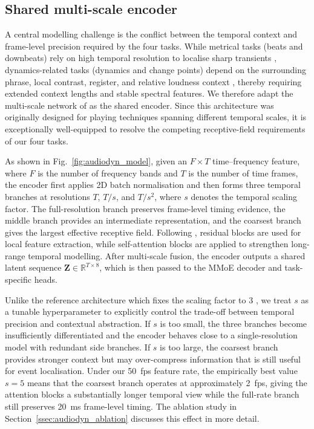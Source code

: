 \subsection{Shared multi-scale encoder}
\label{ssec:audiodyn_encoder}
A central modelling challenge is the conflict between the temporal context and frame-level precision required by the four tasks. While metrical tasks (beats and downbeats) rely on high temporal resolution to localise sharp transients \cite{bock2020deconstruct}, dynamics-related tasks (dynamics and change points) depend on the surrounding phrase, local contrast, register, and relative loudness context \cite{narang2024automatic}, thereby requiring extended context lengths and stable spectral features. We therefore adapt the multi-scale network of \cite{li2023frame} as the shared encoder. Since this architecture was originally designed for playing techniques spanning different temporal scales, it is exceptionally well-equipped to resolve the competing receptive-field requirements of our four tasks.

As shown in Fig.~\ref{fig:audiodyn_model}, given an $F \times T$ time--frequency feature, where $F$ is the number of frequency bands and $T$ is the number of time frames, the encoder first applies 2D batch normalisation and then forms three temporal branches at resolutions $T$, $T/s$, and $T/s^{2}$, where $s$ denotes the temporal scaling factor. The full-resolution branch preserves frame-level timing evidence, the middle branch provides an intermediate representation, and the coarsest branch gives the largest effective receptive field. Following \cite{li2023frame}, residual blocks are used for local feature extraction, while self-attention blocks are applied to strengthen long-range temporal modelling. After multi-scale fusion, the encoder outputs a shared latent sequence $\mathbf{Z} \in \mathbb{R}^{T \times 8}$, which is then passed to the MMoE decoder and task-specific heads.

Unlike the reference architecture which fixes the scaling factor to 3 \cite{li2023frame}, we treat $s$ as a tunable hyperparameter to explicitly control the trade-off between temporal precision and contextual abstraction. If $s$ is too small, the three branches become insufficiently differentiated and the encoder behaves close to a single-resolution model with redundant side branches. If $s$ is too large, the coarsest branch provides stronger context but may over-compress information that is still useful for event localisation. Under our 50~fps feature rate, the empirically best value $s=5$ means that the coarsest branch operates at approximately 2~fps, giving the attention blocks a substantially longer temporal view while the full-rate branch still preserves 20~ms frame-level timing. The ablation study in Section~\ref{ssec:audiodyn_ablation} discusses this effect in more detail.

